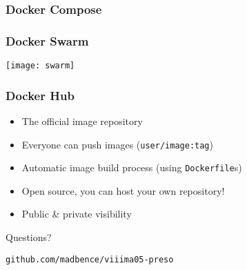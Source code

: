 \documentclass[xetex,mathserif,serif]{beamer}
\begin{document}
  \begin{frame}
    \frametitle{Docker Compose}
  \end{frame}
  \begin{frame}
    \frametitle{Docker Swarm}
    \texttt{[image: swarm]}
  \end{frame}
  \begin{frame}
    \frametitle{Docker Hub}
    \begin{itemize}
      \item The official image repository
      \item Everyone can push images (\texttt{user/image:tag})
      \item Automatic image build process (using \texttt{Dockerfile}s)
      \item Open source, you can host your own repository!
      \item Public \& private visibility
    \end{itemize}
  \end{frame}
  \begin{frame}[c,plain]
    \begin{center}
      {\Huge Questions?}

      \vspace{1cm}

      \texttt{github.com/madbence/viiima05-preso}
    \end{center}
  \end{frame}
\end{document}
